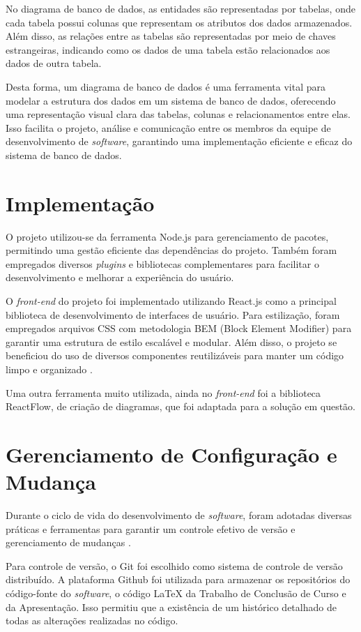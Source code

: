 No diagrama de banco de dados, as entidades são representadas por tabelas, onde cada tabela possui colunas que representam os atributos dos dados armazenados. Além disso, as relações entre as tabelas são representadas por meio de chaves estrangeiras, indicando como os dados de uma tabela estão relacionados aos dados de outra tabela.
            
Desta forma, um diagrama de banco de dados é uma ferramenta vital para modelar a estrutura dos dados em um sistema de banco de dados, oferecendo uma representação visual clara das tabelas, colunas e relacionamentos entre elas. Isso facilita o projeto, análise e comunicação entre os membros da equipe de desenvolvimento de \textit{software}, garantindo uma implementação eficiente e eficaz do sistema de banco de dados.
    
\section{Implementação}

O projeto utilizou-se da ferramenta Node.js para gerenciamento de pacotes, permitindo uma gestão eficiente das dependências do projeto. Também foram empregados diversos \textit{plugins} e bibliotecas complementares para facilitar o desenvolvimento e melhorar a experiência do usuário.

O \textit{front-end} do projeto foi implementado utilizando React.js como a principal biblioteca de desenvolvimento de interfaces de usuário. Para estilização, foram empregados arquivos CSS com metodologia BEM (Block Element Modifier) para garantir uma estrutura de estilo escalável e modular. Além disso, o projeto se beneficiou do uso de diversos componentes reutilizáveis para manter um código limpo e organizado \cite{eloquentjavascript}.

Uma outra ferramenta muito utilizada, ainda no \textit{front-end} foi a biblioteca ReactFlow, de criação de diagramas, que foi adaptada para a solução em questão.
    
\section{Gerenciamento de Configuração e Mudança}

Durante o ciclo de vida do desenvolvimento de \textit{software}, foram adotadas diversas práticas e ferramentas para garantir um controle efetivo de versão e gerenciamento de mudanças \cite{gitevery}.
    
Para controle de versão, o Git foi escolhido como sistema de controle de versão distribuído. A plataforma Github \cite{github} foi utilizada para armazenar os repositórios do código-fonte do \textit{software}, o código LaTeX da Trabalho de Conclusão de Curso e da Apresentação. Isso permitiu que a existência de um histórico detalhado de todas as alterações realizadas no código.
    
